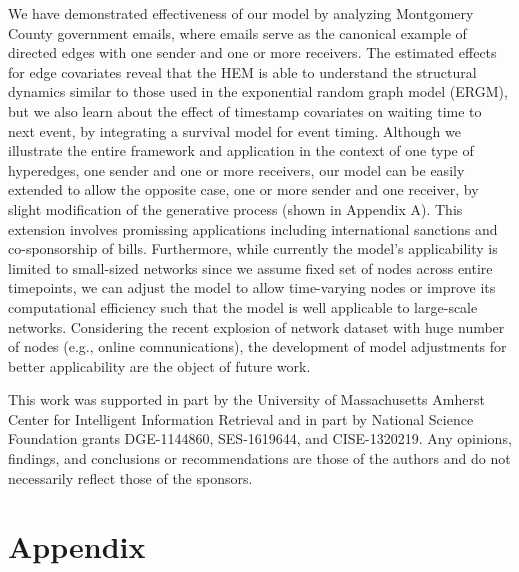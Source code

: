 \documentclass[ba]{imsart}
\numberwithin{equation}{section}
\theoremstyle{plain}
\begin{document}
We have demonstrated effectiveness of our model by analyzing Montgomery County government emails, where emails serve as the canonical example of directed edges with one sender and one or more receivers. The estimated effects for edge covariates reveal that the HEM is able to understand the structural dynamics similar to those used in the exponential random graph model (ERGM), but we also learn about the effect of timestamp covariates on waiting time to next event, by integrating a survival model for event timing. Although we illustrate the entire framework and application in the context of one type of hyperedges, one sender and one or more receivers, our model can be easily extended to allow the opposite case, one or more sender and one receiver, by slight modification of the generative process (shown in Appendix A). This extension involves promissing applications including international sanctions and co-sponsorship of bills. Furthermore, while currently the model's applicability is limited to small-sized networks since we assume fixed set of nodes across entire timepoints, we can adjust the model to allow time-varying nodes or improve its computational efficiency such that the model is well applicable to large-scale networks. Considering the recent explosion of network dataset with huge number of nodes (e.g., online comnunications), the development of model adjustments for better applicability are the object of future work.

\begin{acknowledgement}
	This work was supported in part by the University of Massachusetts Amherst Center for Intelligent Information Retrieval and in part by National Science Foundation grants DGE-1144860, SES-1619644, and CISE-1320219. Any opinions, findings, and conclusions or recommendations are those of the authors and do not necessarily reflect those of the
	sponsors.
\end{acknowledgement}

\section*{Appendix}
\end{document}
